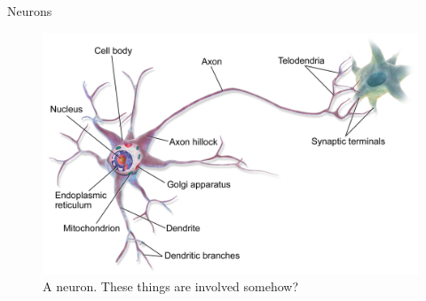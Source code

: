 \documentclass[11pt]{beamer}
\begin{document}
\begin{frame}{Neurons}

\begin{center}
\begin{figure}
\includegraphics[scale=0.2]{Blausen_0657_MultipolarNeuron}
\caption{A neuron. These things are involved somehow?}
\end{figure}
\end{center}
	
\end{frame}
\end{document}
